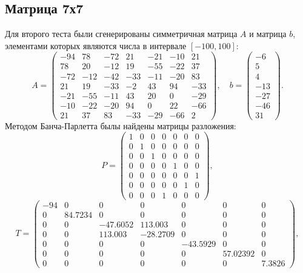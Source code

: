 \documentclass[a4paper, 12pt]{article}   	%
\begin{document}
\subsection{Матрица 7х7}
Для второго теста были сгенерированы симметричная матрица $A$ и матрица $b$, элементами которых являются числа в интервале $[-100, 100]$:
\begin{equation*}
    A = 
    \left(\begin{array}{ccccccc} 
    -94 &  78 &  -72 &  21 &  -21 &  -10 &  21 \\
    78 &  20 &  -12 &  19 &  -55 &  -22 &  37 \\
    -72 &  -12 &  -42 &  -33 &  -11 &  -20 &  83 \\
    21 &  19 &  -33 &  -2 &  43 &  94 &  -33 \\
    -21 &  -55 &  -11 &  43 &  20 &  0 &  -29 \\
    -10 &  -22 &  -20 &  94 &  0 &  22 &  -66 \\
    21 &  37 &  83 &  -33 &  -29 &  -66 &  2 
    \end{array}\right),
    \quad 
    b = 
    \left(\begin{array}{c}
    -6 \\
    5 \\
    4 \\
    -13 \\
    -27 \\
    -46 \\
    31 
     \end{array}\right).
\end{equation*}
Методом Банча-Парлетта былы найдены матрицы разложения:
\begin{equation*}
    P = 
    \left(\begin{array}{ccccccc} 
    1 &  0 &  0 &  0 &  0 &  0 &  0 \\
    0 &  1 &  0 &  0 &  0 &  0 &  0 \\
    0 &  0 &  1 &  0 &  0 &  0 &  0 \\
    0 &  0 &  0 &  0 &  1 &  0 &  0 \\
    0 &  0 &  0 &  0 &  0 &  0 &  1 \\
    0 &  0 &  0 &  0 &  0 &  1 &  0 \\
    0 &  0 &  0 &  1 &  0 &  0 &  0 
    \end{array}\right),
\end{equation*}
\begin{equation*}
    T = 
    \left(\begin{array}{ccccccc} 
    -94 &  0 &  0 &  0 &  0 &  0 &  0 \\
    0 &  84.7234 &  0 &  0 &  0 &  0 &  0 \\
    0 &  0 &  -47.6052 &  113.003 &  0 &  0 &  0 \\
    0 &  0 &  113.003 &  -28.2709 &  0 &  0 &  0 \\
    0 &  0 &  0 &  0 &  -43.5929 &  0 &  0 \\
    0 &  0 &  0 &  0 &  0 &  57.02392 &  0 \\
    0 &  0 &  0 &  0 &  0 &  0 &  7.3826
    \end{array}\right),
\end{equation*}
\end{document}
